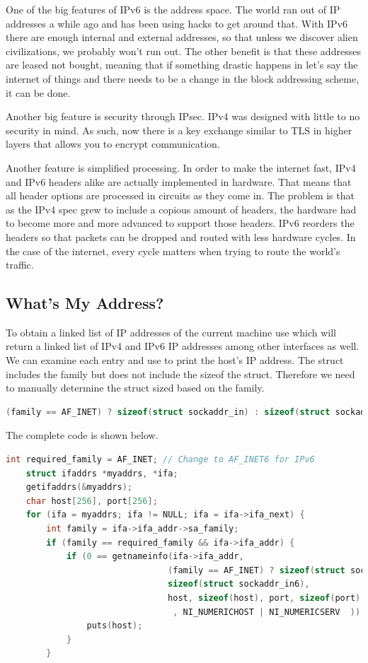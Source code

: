 One of the big features of IPv6 is the address space.
The world ran out of IP addresses a while ago and has been using hacks to get around that.
With IPv6 there are enough internal and external addresses, so that unless we discover alien civilizations, we probably won't run out.
The other benefit is that these addresses are leased not bought, meaning that if something drastic happens in let's say the internet of things and there needs to be a change in the block addressing scheme, it can be done.

Another big feature is security through IPsec.
IPv4 was designed with little to no security in mind.
As such, now there is a key exchange similar to TLS in higher layers that allows you to encrypt communication.

Another feature is simplified processing.
In order to make the internet fast, IPv4 and IPv6 headers alike are actually implemented in hardware.
That means that all header options are processed in circuits as they come in.
The problem is that as the IPv4 spec grew to include a copious amount of headers, the hardware had to become more and more advanced to support those headers.
IPv6 reorders the headers so that packets can be dropped and routed with less hardware cycles.
In the case of the internet, every cycle matters when trying to route the world's traffic.

\subsection{What's My Address?}

To obtain a linked list of IP addresses of the current machine use  which will return a linked list of IPv4 and IPv6 IP addresses among other interfaces as well.
We can examine each entry and use  to print the host's IP address.
The  struct includes the family but does not include the sizeof the struct.
Therefore we need to manually determine the struct sized based on the family.

\begin{lstlisting}[language=C]
 (family == AF_INET) ? sizeof(struct sockaddr_in) : sizeof(struct sockaddr_in6)
\end{lstlisting}

The complete code is shown below.

\begin{lstlisting}[language=C]
    int required_family = AF_INET; // Change to AF_INET6 for IPv6
    struct ifaddrs *myaddrs, *ifa;
    getifaddrs(&myaddrs);
    char host[256], port[256];
    for (ifa = myaddrs; ifa != NULL; ifa = ifa->ifa_next) {
        int family = ifa->ifa_addr->sa_family;
        if (family == required_family && ifa->ifa_addr) {
            if (0 == getnameinfo(ifa->ifa_addr,
                                (family == AF_INET) ? sizeof(struct sockaddr_in) :
                                sizeof(struct sockaddr_in6),
                                host, sizeof(host), port, sizeof(port)
                                 , NI_NUMERICHOST | NI_NUMERICSERV  ))
                puts(host);
            }
        }
\end{lstlisting}

